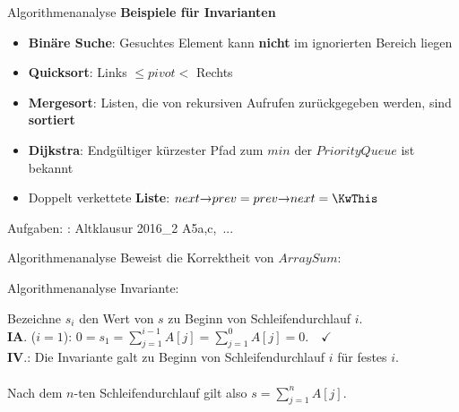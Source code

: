 \begin{frame}{Algorithmenanalyse}
	\textbf{Beispiele für Invarianten} \\
	\begin{itemize}
		\item \textbf{Binäre Suche}: Gesuchtes Element kann \textbf{nicht} im ignorierten Bereich liegen
		\item \textbf{Quicksort}: Links $\leq pivot < $ Rechts
		\item \textbf{Mergesort}: Listen, die von rekursiven Aufrufen zurückgegeben werden, sind \textbf{sortiert}
		\item \textbf{Dijkstra}: Endgültiger kürzester Pfad zum $min$ der $PriorityQueue$ ist bekannt
		\item Doppelt verkettete \textbf{Liste}: $next \access prev = prev \access next = \KwThis$
	\end{itemize}
	\bigskip
	\small
	Aufgaben: \ZB: Altklausur 2016\_2 A5a,c, \,...
\end{frame}

\begin{frame}{Algorithmenanalyse}
	Beweist die Korrektheit von $ArraySum$: 
	\begin{algorithm}[H]
	\end{algorithm}
\end{frame}

\begin{frame}{Algorithmenanalyse}
	\solutionheading
	\Impl Invariante: \\
	\begin{algorithm}[H]
	\end{algorithm}
	Bezeichne $s_i$ den Wert von $s$ zu Beginn von Schleifendurchlauf $i$. \\
	\hanging \textbf{IA}. ($i=1$): \quad $0 = s_1 = \sum\limits_{j=1}^{i-1} A[j] = \sum\limits_{j=1}^{0} A[j] = 0. \quad \checkmark$ \\
	\pause
	\hanging \textbf{IV}.: Die Invariante galt zu Beginn von Schleifendurchlauf $i$ für festes $i$. \\
	\pause
	 \\
	Nach dem $n$-ten Schleifendurchlauf gilt also $s = \sum\limits_{j=1}^{n} A[j]$.
\end{frame}


